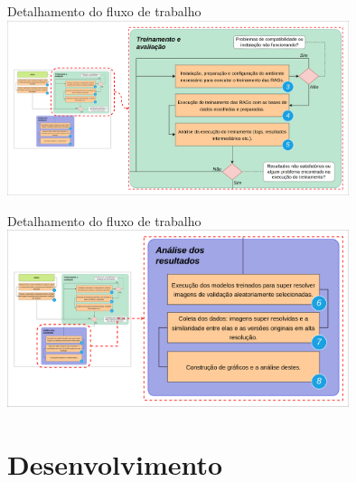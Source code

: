 \documentclass{beamer}
\begin{document}
    \begin{frame}{Detalhamento do fluxo de trabalho}{\thesection \, \secname}
        \centering
        \includegraphics[width=10cm]{img/flow_diagram_development_p2.png} \\
        \label{fig:diagrama_2}
    \end{frame}
    
    \begin{frame}{Detalhamento do fluxo de trabalho}{\thesection \, \secname}
        \centering
        \includegraphics[width=10cm]{img/flow_diagram_development_p3.png} \\
        \label{fig:diagrama_3}
    \end{frame}
    
    \section{Desenvolvimento}
\end{document}
